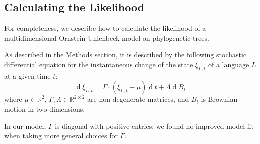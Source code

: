 \documentclass[11pt,a4paper]{article}
\begin{document}

\subsection{Calculating the Likelihood}
For completeness, we describe how to calculate the likelihood of a multidimensional Ornstein-Uhlenbeck model on phylogenetic trees.

As described in the Methods section, it is described by the following stochastic differential equation for the instantaneous change of the state $\xi_{L,t}$ of a language $L$ at a given time $t$:
\begin{equation*}
    \operatorname{d}\xi_{L,t} = \Gamma \cdot (\xi_{L,t}-\mu) \operatorname{d}t + \Lambda \operatorname{d}B_t
\end{equation*}
where $\mu \in \mathbb{R}^2$,  $\Gamma, \Lambda \in \mathbb{R}^{2\times 2}$ are non-degenerate matrices, and $B_t$ is Brownian motion in two dimensions.

In our model, $\Gamma$ is diagonal with positive entries; we found no improved model fit when taking more general choices for $\Gamma$.
\end{document}
